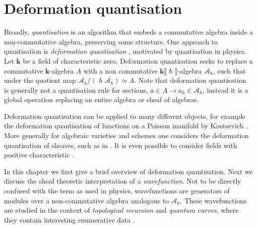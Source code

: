 \chapter{Deformation quantisation}
    \label{chapter:deformation}
    
    Broadly, \emph{quantisation} is an algorithm that embeds a commutative algebra inside a non-commutative algebra, preserving some structure. One approach to quantisation is \emph{deformation quantisation} \cite{chen_thesis,gunningham, k_defquant, b_defquant, quant_for_phys, k_defofPois}, motivated by quantisation in physics. Let \( \mathbf{k}\) be a field of characteristic zero.
    Deformation quantisation seeks to replace a commutative \( \mathbf{k}\)-algebra \(A\) with a non commutative \( \mathbf{k}\lBrack \hslash \rBrack\)-algebra \( \mathcal{A}_{\hslash}\), such that under the quotient map \( \mathcal{A}_{\hslash} / ( \hslash \mathcal{A}_{\hslash}) \simeq A\). Note that deformation quantisation is generally not a quantisation rule for sections, \(a \in A \rightarrow a_\hslash \in \mathcal{A}_{\hslash}\), instead it is a global operation replacing an entire algebra or sheaf of algebras. 

    
    Deformation quantisation can be applied to many different objects, for example the deformation quantisation of functions on a Poisson manifold by Kontsevich \cite{k_defofPois}. More generally for algebraic varieties and schemes one considers the deformation quantisation of sheaves, such as in \cite{yekutieli,k_defquant}. It is even possible to consider fields with positive characteristic \cite{k_holonomic}.  
    
    
    In this chapter we first give a brief overview of deformation quantisation. Next we discuss the sheaf theoretic interpretation of a \emph{wavefunction}. Not to be directly confused with the term as used in physics, wavefunctions are generators of modules over a non-commutative algebra analogous to \( \mathcal{A}_{\hslash}\). These wavefunctions are studied in the context of \emph{topological recursion} and \emph{quantum curves}, where they contain interesting enumerative data \cite{norbury_quant}.
    

